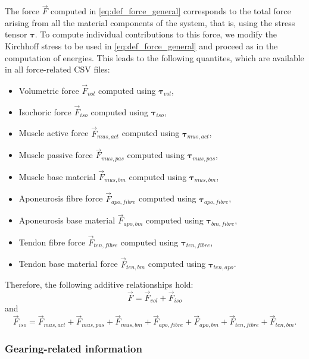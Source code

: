 \documentclass{sfuthesis}
\numberwithin{equation}{section}
\numberwithin{figure}{chapter}
\numberwithin{table}{chapter}
\theoremstyle{definition}
\def\btau{{\bm{\tau}}}
\begin{document}
The force $\vec{F}$ computed in \eqref{eq:def_force_general} corresponds to the total force arising from all the material components of the system, that is, using the stress tensor $\btau$. To compute individual contributions to this force, we modify the Kirchhoff stress to be used in \eqref{eq:def_force_general} and proceed as in the computation of energies. This leads to the following quantites, which are available in all force-related CSV files:
\begin{itemize}
    \item Volumetric force $\vec{F}_{vol}$ computed using $\btau_{vol}$,
    \item Isochoric force $\vec{F}_{iso}$ computed using $\btau_{iso}$,
    \item Muscle active force $\vec{F}_{mus,act}$ computed using $\btau_{mus,act}$,
    \item Muscle passive force $\vec{F}_{mus,pas}$ computed using $\btau_{mus,pas}$,
    \item Muscle base material $\vec{F}_{mus,bm}$ computed using $\btau_{mus,bm}$,
    \item Aponeurosis fibre force $\vec{F}_{apo,fibre}$ computed using $\btau_{apo,fibre}$,
    \item Aponeurosis base material $\vec{F}_{apo,bm}$ computed using $\btau_{bm,fibre}$,
    \item Tendon fibre force $\vec{F}_{ten,fibre}$ computed using $\btau_{ten,fibre}$,
    \item Tendon base material force $\vec{F}_{ten,bm}$ computed using $\btau_{ten,apo}$.
\end{itemize}
Therefore, the following additive relationships hold:
\begin{equation}
    \vec{F} = \vec{F}_{vol} + \vec{F}_{iso}
\end{equation}
and
\begin{equation}
    \vec{F}_{iso} = \vec{F}_{mus,act} + \vec{F}_{mus,pas} + \vec{F}_{mus,bm} + \vec{F}_{apo,fibre} + \vec{F}_{apo,bm} + \vec{F}_{ten,fibre} + \vec{F}_{ten,bm}.
\end{equation}

\subsubsection{Gearing-related information}
\end{document}
